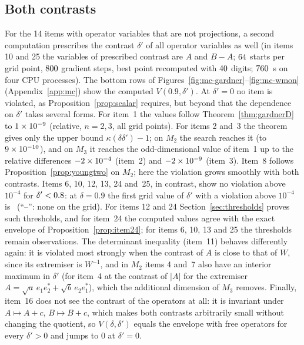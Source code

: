 \documentclass[11pt]{article}
\theoremstyle{plain}
\theoremstyle{definition}
\theoremstyle{remark}
\begin{document}
\subsection{Both contrasts}\label{sec:bothcontrasts}

For the 14 items with operator variables that are not projections, a second computation prescribes the contrast
$\delta'$ of all operator variables as well (in items 10 and 25 the variables of prescribed contrast are $A$ and $B-A$;
$64$ starts per grid point, $800$ gradient steps, best point
recomputed with $40$ digits; $760$~s on four CPU processes). The bottom rows of
Figures~\ref{fig:mc-gardner}--\ref{fig:mc-wmon} (Appendix~\ref{app:mc}) show the computed $V(0.9,\delta')$. At
$\delta'=0$ no item is violated, as Proposition~\ref{prop:scalar} requires, but beyond that the dependence on $\delta'$
takes several forms. For item~1 the values follow Theorem~\ref{thm:gardnerD} to $1\times10^{-9}$ (relative, $n=2,3$,
all grid points). For items 2 and~3 the theorem gives only the upper bound $\kappa(\delta\delta')-1$; on $M_2$ the
search reaches it (to $9\times10^{-10}$), and on $M_3$ it reaches the odd-dimensional value of item~1 up to the
relative differences $-2\times10^{-4}$ (item~2) and $-2\times10^{-9}$ (item~3). Item~8 follows
Proposition~\ref{prop:youngtwo} on $M_2$; here the violation grows smoothly with both contrasts. Items 6, 10, 12, 13, 24
and~25, in contrast, show no violation above $10^{-4}$ for $\delta'<0.8$: at $\delta=0.9$ the first grid
value of $\delta'$ with a violation above $10^{-4}$ is \TCCThresholds\ (``--'': none on the grid). For items 12 and 24
Section~\ref{sec:thresholds} proves such thresholds, and for item~24 the computed values agree with the exact envelope of
Proposition~\ref{prop:item24}; for items 6, 10, 13 and 25 the thresholds remain observations. The determinant inequality
(item~11) behaves differently again: it is violated most strongly when the contrast of $A$ is close to that of $W$, since
its extremiser is $W^{-1}$, and in $M_2$ items 4 and~7 also have an interior maximum in $\delta'$ (for item~4 at the
contrast of $|A|$ for the extremiser $A=\sqrt a\,e_1e_2^*+\sqrt b\,e_2e_1^*$), which the additional dimension of $M_3$
removes. Finally, item~16 does not see the contrast of the operators at all: it is invariant under $A\mapsto A+c$,
$B\mapsto B+c$, which makes both contrasts arbitrarily small without changing the quotient, so $V(\delta,\delta')$ equals the
envelope with free operators for every $\delta'>0$ and jumps to $0$ at $\delta'=0$.
\end{document}
